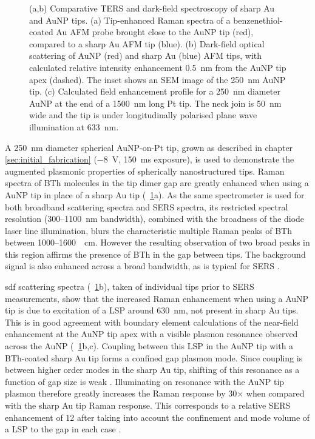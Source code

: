 \documentclass{article}
\begin{document}
\begin{figure}[bt]
{%
(a,b) Comparative TERS and dark-field spectroscopy of sharp Au and AuNP tips. (a) Tip-enhanced Raman spectra of a benzenethiol-coated Au AFM probe brought close to the AuNP tip (red), compared to a sharp Au AFM tip (blue). (b) Dark-field optical scattering of AuNP (red) and sharp Au (blue) AFM tips, with calculated relative intensity enhancement \SI{0.5}{nm} from the AuNP tip apex (dashed). The inset shows an SEM image of the \SI{250}{nm} AuNP tip. %
(c) Calculated field enhancement profile for a \SI{250}{nm} diameter AuNP at the end of a \SI{1500}{nm} long Pt tip. The neck join is \SI{50}{nm} wide and the tip is under longitudinally polarised plane wave illumination at \SI{633}{nm}.}
\label{fig:ters_comparison}
\end{figure}

A \SI{250}{nm} diameter spherical AuNP-on-Pt tip, grown as described in chapter \ref{sec:initial_fabrication} (\SI{-8}{V}, \SI{150}{ms} exposure), is used to demonstrate the augmented plasmonic properties of spherically nanostructured tips. Raman spectra of BTh molecules in the tip dimer gap are greatly enhanced when using a AuNP tip in place of a sharp Au tip (\figurename~\ref{fig:ters_comparison}a). As the same spectrometer is used for both broadband scattering spectra and SERS spectra, its restricted spectral resolution (300--\SI{1100}{nm} bandwidth), combined with the broadness of the diode laser line illumination, blurs the characteristic multiple Raman peaks of BTh between 1000--\SI{1600}{\per\centi\metre}. However the resulting observation of two broad peaks in this region affirms the presence of BTh in the gap between tips. The background signal is also enhanced across a broad bandwidth, as is typical for SERS \cite{mahajan2009}.

\Gls{sdf} scattering spectra (\figurename~\ref{fig:ters_comparison}b), taken of individual tips prior to SERS measurements, show that the increased Raman enhancement when using a AuNP tip is due to excitation of a LSP around \SI{630}{nm}, not present in sharp Au tips. This is in good agreement with boundary element calculations of the near-field enhancement at the AuNP tip apex with a visible plasmon resonance observed across the AuNP (\figurename~\ref{fig:ters_comparison}b,c).
Coupling between this LSP in the AuNP tip with a BTh-coated sharp Au tip forms a confined gap plasmon mode. Since coupling is between higher order modes in the sharp Au tip, shifting of this resonance as a function of gap size is weak \cite{downes2006, hugall2012}. Illuminating on resonance with the AuNP tip plasmon therefore greatly increases the Raman response by 30$\times$ when compared with the sharp Au tip Raman response. This corresponds to a relative SERS enhancement of 12 after taking into account the confinement and mode volume of a LSP to the gap in each case \cite{romero2006}.
\end{document}
